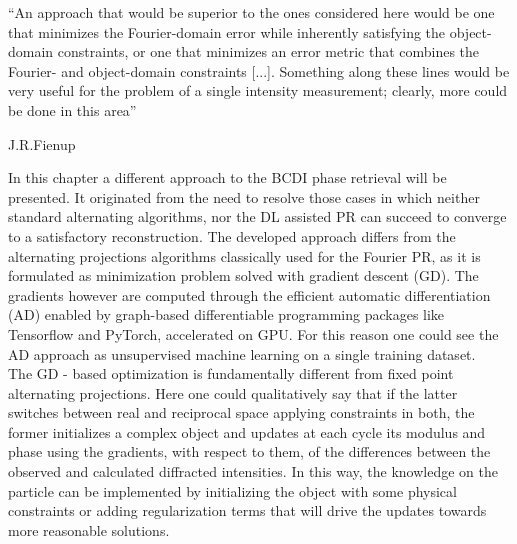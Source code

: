 
\epigraph{``An approach that would be superior to the ones considered here would be one that minimizes the Fourier-domain error while inherently satisfying the object-domain
constraints, or one that minimizes an error metric that combines the Fourier- and object-domain constraints [...]. 
Something along these lines would be very useful for the problem of a single intensity measurement; clearly, 
more could be done in this area''}{J.R.Fienup \cite{fienup_phase_1982}}

In this chapter a different approach to the BCDI phase retrieval will be presented. It originated from the need to resolve 
those cases in which neither standard alternating algorithms, nor the DL assisted PR can succeed to converge to a satisfactory 
reconstruction. The developed approach differs from the alternating projections algorithms classically used for 
the Fourier PR, as it is formulated as minimization problem solved with gradient descent (GD). The gradients however are computed 
through the efficient automatic differentiation (AD) enabled by graph-based differentiable programming packages like Tensorflow and 
PyTorch, accelerated on GPU. For this reason one could see the AD approach as unsupervised machine learning on a single training 
dataset.\\ 
The GD - based optimization is fundamentally different from fixed point alternating projections. Here one could qualitatively say 
that if the latter switches between real and reciprocal space applying constraints in both, the former initializes a 
complex object and updates at each cycle its modulus and phase using the gradients, with respect to them, of the differences 
between the observed and calculated diffracted intensities. In this way, the knowledge on the particle can be implemented 
by initializing the object with some physical constraints or adding regularization terms that will drive the updates 
towards more reasonable solutions. \\


